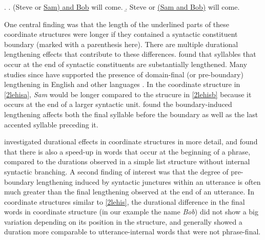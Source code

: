 \documentclass[preprint,review,12pt,authoryear,times]{elsarticle}
\begin{document}
\ex.\label{2lehis}
\a. (Steve or \underline{Sam) and Bob} will come.\label{2lehisa}
\b.  Steve or \underline{(Sam and Bob)} will come.\label{2lehisb}

\noindent One central finding was that the length of the underlined parts of these coordinate structures were longer if they contained a syntactic constituent boundary (marked with a parenthesis here).  There are multiple durational lengthening effects that contribute to these differences. \citet{klatt75} found that syllables that occur at the end of syntactic constituents are substantially lengthened.  Many studies since have supported the presence of domain-final (or pre-boundary) lengthening in English and other languages \citep{wight92, price91,shatt96,byrd98,cho01,byrd03,cho16}. In the coordinate structure in \ref{2lehisa}, {\em Sam} would be longer compared to the strucure in \ref{2lehisb} because it occurs at the end of a larger syntactic unit. \citet{turk07} found the boundary-induced lengthening affects both the final syllable before the boundary as well as the last accented syllable preceding it. 

 \citet{wagner05recursion} investigated durational effects in coordinate structures in more detail, and found that there is also a speed-up in words that occur at the beginning of a phrase, compared to the durations observed in a simple list structure without internal syntactic branching. A second finding of interest was that the degree of pre-boundary lengthening induced by syntactic junctures within an utterance is often much greater than the final lengthening observed at the end of an utterance. In coordinate structures similar to \ref{2lehis},  the durational difference in the final words in coordinate structure (in our example the name {\em Bob}) did not show a big variation depending on its position in the structure, and generally showed a duration more comparable to utterance-internal words that were not phrase-final. 
 
\end{document}

